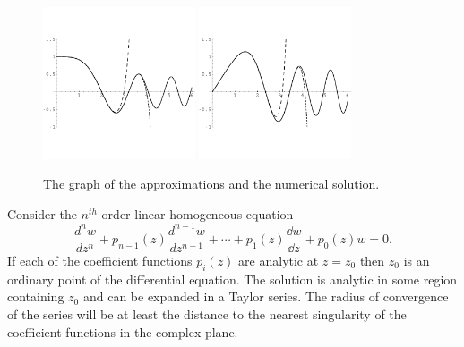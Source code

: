 \begin{Example}
  \begin{figure}[tb!]
    \begin{center}
      \includegraphics[width=0.4\textwidth]{ode/series/w_one}
      \includegraphics[width=0.4\textwidth]{ode/series/w_two}
    \end{center}
    \caption{The graph of the approximations and the numerical solution.}
    \label{w_one_two}
  \end{figure}


\end{Example}






\begin{Result}
  Consider the $n^{t h}$ order linear homogeneous equation
  \[ \frac{d^n w}{dz^n} + p_{n-1}(z) \frac{d^{n-1}w}{dz^{n-1}} + \cdots
  + p_1(z) \frac{\dd w}{\dd z} + p_0(z) w  = 0.\]
  If each of the coefficient functions $p_i(z)$ are analytic at $z=z_0$
  then $z_0$ is an ordinary point of the differential equation.
  The solution is analytic in some region containing $z_0$ and can
  be expanded in a Taylor series.  The radius of convergence of the
  series will be at least the distance to the nearest singularity of
  the coefficient functions in the complex plane.
\end{Result}
















